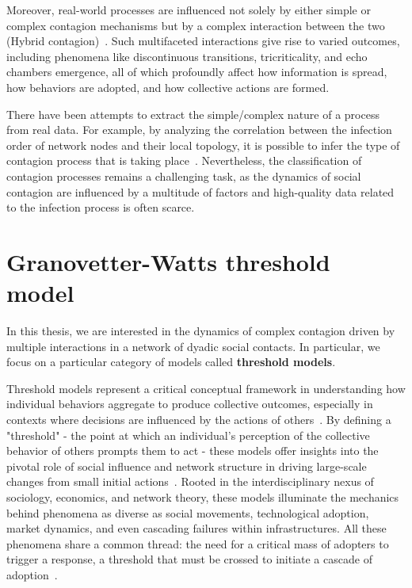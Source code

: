Moreover, real-world processes are influenced not solely by either simple or complex contagion mechanisms but by a complex interaction between the two (Hybrid contagion)~\cite{min-2018,diaz-diaz-2022}. Such multifaceted interactions give rise to varied outcomes, including phenomena like discontinuous transitions, tricriticality, and echo chambers emergence, all of which profoundly affect how information is spread, how behaviors are adopted, and how collective actions are formed.

There have been attempts to extract the simple/complex nature of a process from real data. For example, by analyzing the correlation between the infection order of network nodes and their local topology, it is possible to infer the type of contagion process that is taking place~\cite{cencetti-2023}. Nevertheless, the classification of contagion processes remains a challenging task, as the dynamics of social contagion are influenced by a multitude of factors and high-quality data related to the infection process is often scarce.

\section{\label{sec:Granovetter-Watts threshold model} Granovetter-Watts threshold model}

In this thesis, we are interested in the dynamics of complex contagion driven by multiple interactions in a network of dyadic social contacts. In particular, we focus on a particular category of models called \textbf{threshold models}.

Threshold models represent a critical conceptual framework in understanding how individual behaviors aggregate to produce collective outcomes, especially in contexts where decisions are influenced by the actions of others~\cite{granovetter-1973,granovetter-1978}. By defining a "threshold" - the point at which an individual's perception of the collective behavior of others prompts them to act - these models offer insights into the pivotal role of social influence and network structure in driving large-scale changes from small initial actions~\cite{dodds-2004}. Rooted in the interdisciplinary nexus of sociology, economics, and network theory, these models illuminate the mechanics behind phenomena as diverse as social movements, technological adoption, market dynamics, and even cascading failures within infrastructures. All these phenomena share a common thread: the need for a critical mass of adopters to trigger a response, a threshold that must be crossed to initiate a cascade of adoption~\cite{centola-2007,centola-2010}.


